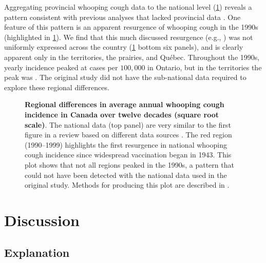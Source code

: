 \documentclass[12pt]{article}
\begin{document}
Aggregating provincial whooping cough data to the national level (\cref{fig:whooping-plot}) reveals a pattern consistent with previous analyses that lacked provincial data \cite{thommes2020revisiting}. One feature of this pattern is an apparent resurgence of whooping cough in the 1990s (highlighted in \cref{fig:whooping-plot}). We find that this much discussed resurgence (e.g., \cite{thommes2020revisiting}) was not uniformly expressed across the country (\cref{fig:whooping-plot} bottom six panels), and is clearly apparent only in the territories, the prairies, and Qu\'ebec. Throughout the 1990s, yearly incidence peaked at  cases per $100,000$ in Ontario, but in the territories the peak was . The original study \cite{thommes2020revisiting} did not have the sub-national data required to explore these regional differences.

\begin{figure}[!htb]
\caption{\textbf{Regional \cite{SGC2021} differences in average annual whooping cough incidence in Canada over twelve decades (square root scale)}. The national data (top panel) are very similar to the first figure in a review based on different data sources \cite{thommes2020revisiting}. The red region (1990--1999) highlights the first resurgence in national whooping cough incidence since widespread vaccination began in 1943. This plot shows that not all regions peaked in the 1990s, a pattern that could not have been detected with the national data used in the original study. Methods for producing this plot are described in .}\label{fig:whooping-plot}
\end{figure}

\section{Discussion}\label{sec:interpretation}

\subsection{Explanation}\label{sec:explanation}
\end{document}
